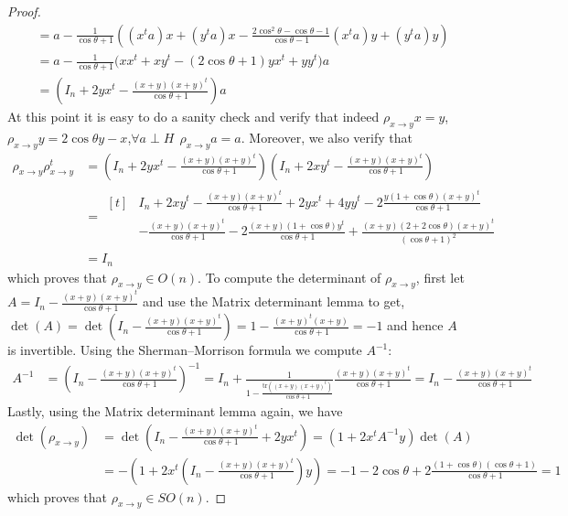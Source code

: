 \begin{proof}
\begin{align*}
&=a-\frac{1}{\cos\theta+1}\left((x^ta)x+(y^ta)x-\frac{2\cos^2\theta-\cos\theta-1}{\cos\theta-1}(x^ta)y+(y^ta)y\right)\\
&=a-\frac{1}{\cos\theta+1}\big(xx^t+xy^t-(2\cos\theta+1)yx^t+yy^t\big)a\\
&=\left(I_n+2yx^t-\frac{(x+y)(x+y)^t}{\cos\theta+1}\right)a
\end{align*}
\endgroup
At this point it is easy to do a sanity check and verify that indeed
$\rho_{x\to y}x=y$,$\rho_{x\to y}y=2\cos\theta y-x$,$\forall a\perp H\ \ \rho_{x\to y}a=a$.
Moreover, we also verify that
\begin{align*}
\rho_{x\to y}\rho_{x\to y}^t&=\left(I_n+2yx^t-\frac{(x+y)(x+y)^t}{\cos\theta+1}\right)\left(I_n+2xy^t-\frac{(x+y)(x+y)^t}{\cos\theta+1}\right)\\
&=\begin{aligned}[t]&I_n+2xy^t-\frac{(x+y)(x+y)^t}{\cos\theta+1}+2yx^t+4yy^t-2\frac{y(1+\cos\theta)(x+y)^t}{\cos\theta+1}\\
&-\frac{(x+y)(x+y)^t}{\cos\theta+1}-2\frac{(x+y)(1+\cos\theta)y^t}{\cos\theta+1}+\frac{(x+y)(2+2\cos\theta)(x+y)^t}{(\cos\theta+1)^2}\end{aligned}\\
&=I_n
\end{align*}
which proves that $\rho_{x\to y}\in O(n)$. To compute the determinant of $\rho_{x\to y}$, first let $A=I_n-\frac{(x+y)(x+y)^t}{\cos\theta+1}$ and use the Matrix determinant lemma to get,
$\det(A)=\det\left(I_n-\frac{(x+y)(x+y)^t}{\cos\theta+1}\right)=1-\frac{(x+y)^t(x+y)}{\cos\theta+1}=-1$
and hence $A$ is invertible. Using the Sherman–Morrison formula we compute $A^{-1}$:
\begin{align*}
A^{-1}&=\left(I_n-\frac{(x+y)(x+y)^t}{\cos\theta+1}\right)^{-1}
=I_n+\frac{1}{1-\frac{\mathrm{tr}\left((x+y)(x+y)^t\right)}{\cos\theta+1}}\frac{(x+y)(x+y)^t}{\cos\theta+1}
=I_n-\frac{(x+y)(x+y)^t}{\cos\theta+1}
\end{align*}
Lastly, using the Matrix determinant lemma again, we have
\begin{align*}
\det(\rho_{x\to y})&=\det\left(I_n-\frac{(x+y)(x+y)^t}{\cos\theta+1}+2yx^t\right)
=\left(1+2x^tA^{-1}y\right)\det(A)\\
&=-\left(1+2x^t\left(I_n-\frac{(x+y)(x+y)^t}{\cos\theta+1}\right)y\right)
=-1-2\cos\theta+2\frac{(1+\cos\theta)(\cos\theta+1)}{\cos\theta+1}=1
\end{align*}
which proves that $\rho_{x\to y}\in SO(n)$.
\end{proof}

